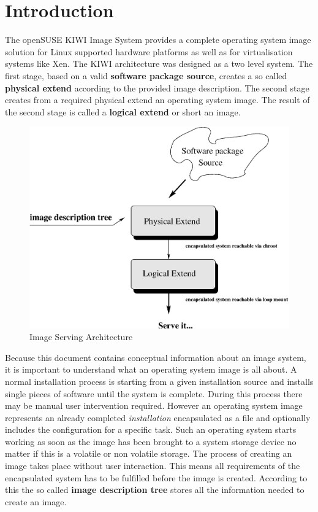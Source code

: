 \chapter{Introduction}

The openSUSE KIWI Image System provides a complete operating system
image solution for Linux supported hardware platforms as well as
for virtualisation systems like Xen. The KIWI architecture was designed
as a two level system. The first stage, based on a valid
\textbf{software package source}, creates a so called \textbf{physical extend}
according to the provided image description. The second stage creates from
a required physical extend an operating system image. The result of the
second stage is called a \textbf{logical extend} or short an image.

\begin{figure}[h]
\centering
\includegraphics[scale=0.5]{pictures/intro.eps}
\caption{Image Serving Architecture}
\label{fig:architecture}
\end{figure}

Because this document contains conceptual information about an image system,
it is important to understand what an operating system image is all about.
A normal installation process is starting from a given installation source
and installs single pieces of software until the system is complete. During
this process there may be manual user intervention required. However an
operating system image represents an already completed \textit{installation}
encapsulated as a file and optionally includes the configuration for a
specific task. Such an operating system starts working as soon as the
image has been brought to a system storage device no matter if this is a
volatile or non volatile storage. The process of creating an image takes
place without user interaction.
This means all requirements of the encapsulated system has to be fulfilled
before the image is created. According to this the so called
\textbf{image description tree} stores all the information needed to
create an image.

